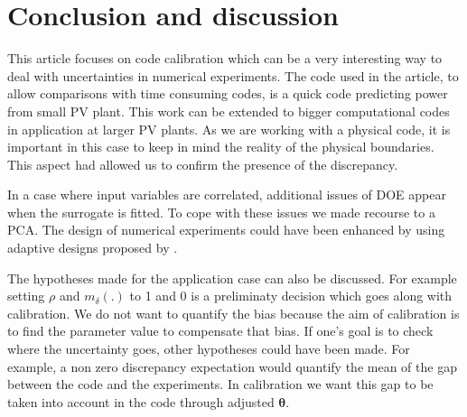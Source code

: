 \documentclass[soumission]{jsfds}
\begin{document}
\section{Conclusion and discussion}

This article focuses on code calibration which can be a very interesting way to deal with uncertainties in numerical experiments. The code used in the article, to allow comparisons with time consuming codes, is a quick code predicting power from small PV plant. This work can be extended to bigger computational codes in application at larger PV plants. As we are working with a physical code, it is important in this case to keep in mind the reality of the physical boundaries. This aspect had allowed us to confirm the presence of the discrepancy.\newline

In a case where input variables are correlated, additional issues of DOE appear when the surrogate is fitted. To cope with these issues we made recourse to a PCA. The design of numerical experiments could have been enhanced by using adaptive designs proposed by \citet{damblin2018}. \newline

The hypotheses made for the application case can also be discussed. For example setting $\rho$ and $m_{\delta}(.)$ to 1 and 0 is a preliminaty decision which goes along with calibration. We do not want to quantify the bias because the aim of calibration is to find the parameter value to compensate that bias. If one's goal is to check where the uncertainty goes, other hypotheses could have been made. For example, a non zero discrepancy expectation would quantify the mean of the gap between the code and the experiments. In calibration we want this gap to be taken into account in the code through adjusted $\boldsymbol{\theta}$.\newline

\end{document}
